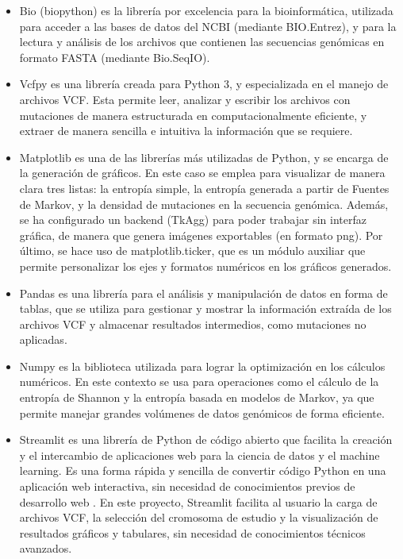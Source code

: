 \documentclass[11pt,spanish,listoffigures,listoftables]{tfgetsinf}
\begin{document}
\begin{itemize}
   \item Bio (biopython) es la librería por excelencia para la bioinformática, utilizada para acceder a las bases de datos del NCBI (mediante BIO.Entrez), y para la lectura y análisis de los archivos que contienen las secuencias genómicas en formato FASTA (mediante Bio.SeqIO).
   \item Vcfpy es una librería creada para Python 3, y especializada en el manejo de archivos VCF. Esta permite leer, analizar y escribir los archivos con mutaciones de manera estructurada en computacionalmente eficiente, y extraer de manera sencilla e intuitiva la información que se requiere.
   \item Matplotlib es una de las librerías más utilizadas de Python, y se encarga de la generación de gráficos. En este caso se emplea para visualizar de manera clara tres listas: la entropía simple, la entropía generada a partir de Fuentes de Markov, y la densidad de mutaciones en la secuencia genómica. Además, se ha configurado un backend (TkAgg) para poder trabajar sin interfaz gráfica, de manera que genera imágenes exportables (en formato png). Por último, se hace uso de matplotlib.ticker, que es un módulo auxiliar que permite personalizar los ejes y formatos numéricos en los gráficos generados.
   \item Pandas es una librería para el análisis y manipulación de datos en forma de tablas, que se utiliza para gestionar y mostrar la información extraída de los archivos VCF y almacenar resultados intermedios, como mutaciones no aplicadas.
   \item Numpy es la biblioteca utilizada para lograr la optimización en los cálculos numéricos. En este contexto se usa para operaciones como el cálculo de la entropía de Shannon y la entropía basada en modelos de Markov, ya que permite manejar grandes volúmenes de datos genómicos de forma eficiente.
   \item Streamlit es una librería de Python de código abierto que facilita la creación y el intercambio de aplicaciones web para la ciencia de datos y el machine learning. Es una forma rápida y sencilla de convertir código Python en una aplicación web interactiva, sin necesidad de conocimientos previos de desarrollo web . En este proyecto, Streamlit facilita al usuario la carga de archivos VCF, la selección del cromosoma de estudio y la visualización de resultados gráficos y tabulares, sin necesidad de conocimientos técnicos avanzados.
\end{itemize}
\end{document}

